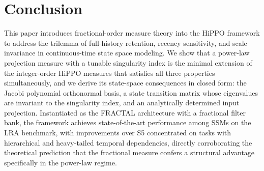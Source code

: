 \documentclass{article}
\theoremstyle{plain}
\theoremstyle{definition}
\theoremstyle{remark}
\begin{document}
\section{Conclusion}
\label{sec:conclusion}
%
This paper introduces fractional-order measure theory into the HiPPO framework to address the trilemma of full-history retention, recency sensitivity, and scale invariance in continuous-time state space modeling.
We show that a power-law projection measure with a tunable singularity index is the
minimal extension of the integer-order HiPPO measures that satisfies all three
properties simultaneously, and we derive its state-space consequences in closed form:
the Jacobi polynomial orthonormal basis, a state transition matrix whose eigenvalues are
invariant to the singularity index, and an analytically determined input projection.
Instantiated as the FRACTAL architecture with a fractional filter bank, the framework
achieves state-of-the-art performance among SSMs on the LRA benchmark,
with improvements over S5 concentrated on tasks with hierarchical and heavy-tailed temporal
dependencies, directly corroborating the theoretical prediction that the fractional measure
confers a structural advantage specifically in the power-law regime.
\end{document}
